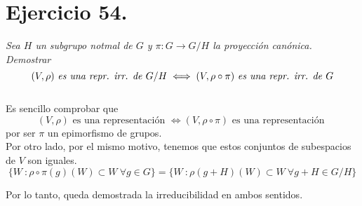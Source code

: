 \section{Ejercicio 54. }\emph{ Sea \(H\) un subgrupo notmal de \(G\) y \(\pi:G \to G/H\) la proyección canónica. Demostrar }
\[
  (V,\rho) \text{ \emph{es una repr. irr. de} } G/H \iff (V,\rho \circ \pi) \text{ \emph{es una repr. irr. de} } G
\]\\

Es sencillo comprobar que
\[
  (V,\rho) \text{ es una representación } \iff (V, \rho \circ \pi ) \text{ es una representación }
\]
por ser \(\pi\) un epimorfismo de grupos.\\

Por otro lado, por el mismo motivo, tenemos que estos conjuntos de subespacios de \(V\) son iguales.
\[
   \{ W \ :  \rho \circ \pi(g)(W) \subset W \ \forall g \in G\} = \{ W \ : \rho(g+H)(W) \subset W \ \forall g+H \in G/H\}
\]

Por lo tanto, queda demostrada la irreducibilidad en ambos sentidos.
